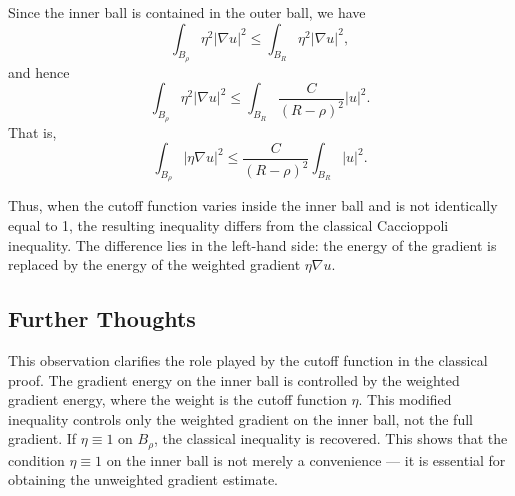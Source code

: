 \begin{answer}
    Since the inner ball is contained in the outer ball, we have
    \[
    \int_{B_\rho} \eta^2 |\nabla u|^2 \le \int_{B_R} \eta^2 |\nabla u|^2,
    \]
    and hence
    \begin{equation}
        \int_{B_\rho} \eta^2 |\nabla u|^2 \le \int_{B_R} \frac{C}{(R-\rho)^2} |u|^2. \tag{6}
    \end{equation}
    That is,
    \begin{equation}
        \boxed{
            \int_{B_\rho} |\eta \nabla u|^2
            \le
            \frac{C}{(R-\rho)^2}
            \int_{B_R} |u|^2
        }. \tag{7}
    \end{equation}

    Thus, when the cutoff function varies inside the inner ball and is not identically equal to 1, the resulting inequality differs from the classical Caccioppoli inequality. The difference lies in the left-hand side: the energy of the gradient is replaced by the energy of the weighted gradient $\eta \nabla u$.

    \subsection*{Further Thoughts}
    This observation clarifies the role played by the cutoff function in the classical proof. The gradient energy on the inner ball is controlled by the weighted gradient energy, where the weight is the cutoff function $\eta$. This modified inequality controls only the weighted gradient on the inner ball, not the full gradient. If $\eta \equiv 1$ on $B_\rho$, the classical inequality is recovered. This shows that the condition $\eta \equiv 1$ on the inner ball is not merely a convenience — it is essential for obtaining the unweighted gradient estimate.
\end{answer}